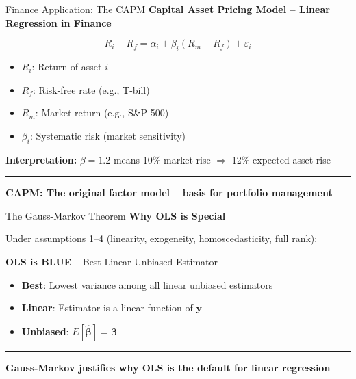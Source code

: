 \documentclass[8pt,aspectratio=169]{beamer}
\newcommand{\bottomnote}[1]{%
\vfill
\vspace{-2mm}
\textcolor{mllavender2}{\rule{\textwidth}{0.4pt}}
\vspace{1mm}
\footnotesize
\textbf{#1}
}
\begin{document}
\begin{frame}[t]{Finance Application: The CAPM}
  \textbf{Capital Asset Pricing Model -- Linear Regression in Finance}

  \begin{equation}
    R_i - R_f = \alpha_i + \beta_i (R_m - R_f) + \varepsilon_i
  \end{equation}

  \begin{itemize}
    \item $R_i$: Return of asset $i$
    \item $R_f$: Risk-free rate (e.g., T-bill)
    \item $R_m$: Market return (e.g., S\&P 500)
    \item $\beta_i$: Systematic risk (market sensitivity)
  \end{itemize}

  \vspace{0.3em}
  \textbf{Interpretation:} $\beta = 1.2$ means 10\% market rise $\Rightarrow$ 12\% expected asset rise

  \bottomnote{CAPM: The original factor model -- basis for portfolio management}
\end{frame}

\begin{frame}[t]{The Gauss-Markov Theorem}
  \textbf{Why OLS is Special}

  \vspace{0.5em}
  Under assumptions 1--4 (linearity, exogeneity, homoscedasticity, full rank):

  \begin{center}
    \textbf{OLS is BLUE} -- Best Linear Unbiased Estimator
  \end{center}

  \begin{itemize}
    \item \textbf{Best}: Lowest variance among all linear unbiased estimators
    \item \textbf{Linear}: Estimator is a linear function of $\mathbf{y}$
    \item \textbf{Unbiased}: $E[\hat{\boldsymbol{\beta}}] = \boldsymbol{\beta}$
  \end{itemize}

  \bottomnote{Gauss-Markov justifies why OLS is the default for linear regression}
\end{frame}
\end{document}
